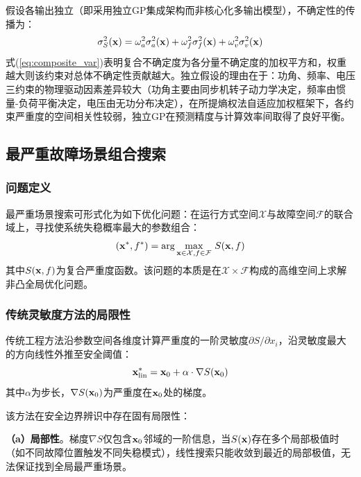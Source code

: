 假设各输出独立（即采用独立GP集成架构而非核心化多输出模型），不确定性的传播为：
\begin{equation}
    \sigma_S^2(\mathbf{x}) = \omega_a^2 \sigma_a^2(\mathbf{x}) + \omega_f^2 \sigma_f^2(\mathbf{x}) + \omega_v^2 \sigma_v^2(\mathbf{x})
    \label{eq:composite_var}
\end{equation}
式(\ref{eq:composite_var})表明复合不确定度为各分量不确定度的加权平方和，权重越大则该约束对总体不确定性贡献越大。独立假设的理由在于：功角、频率、电压三约束的物理驱动因素差异较大（功角主要由同步机转子动力学决定，频率由惯量-负荷平衡决定，电压由无功分布决定），在所提熵权法自适应加权框架下，各约束严重度的空间相关性较弱，独立GP在预测精度与计算效率间取得了良好平衡。

\subsection{最严重故障场景组合搜索}
\label{subsec:worst_case}

\subsubsection{问题定义}

最严重场景搜索可形式化为如下优化问题：在运行方式空间$\mathcal{X}$与故障空间$\mathcal{F}$的联合域上，寻找使系统失稳概率最大的参数组合：
\begin{equation}
    (\mathbf{x}^*, f^*) = \arg\max_{\mathbf{x} \in \mathcal{X}, f \in \mathcal{F}} \, S(\mathbf{x}, f)
    \label{eq:worst_case}
\end{equation}
其中$S(\mathbf{x}, f)$为复合严重度函数。该问题的本质是在$\mathcal{X} \times \mathcal{F}$构成的高维空间上求解非凸全局优化问题。

\subsubsection{传统灵敏度方法的局限性}

传统工程方法\cite{hamilton2023shap_tsa}沿参数空间各维度计算严重度的一阶灵敏度$\partial S / \partial x_i$，沿灵敏度最大的方向线性外推至安全阈值：
\begin{equation}
    \mathbf{x}_{\text{lin}}^* = \mathbf{x}_0 + \alpha \cdot \nabla S(\mathbf{x}_0)
    \label{eq:sensitivity_search}
\end{equation}
其中$\alpha$为步长，$\nabla S(\mathbf{x}_0)$为严重度在$\mathbf{x}_0$处的梯度。

该方法在安全边界辨识中存在固有局限性：

\textbf{（a）局部性}。梯度$\nabla S$仅包含$\mathbf{x}_0$邻域的一阶信息，当$S(\mathbf{x})$存在多个局部极值时（如不同故障位置触发不同失稳模式），线性搜索只能收敛到最近的局部极值，无法保证找到全局最严重场景。

